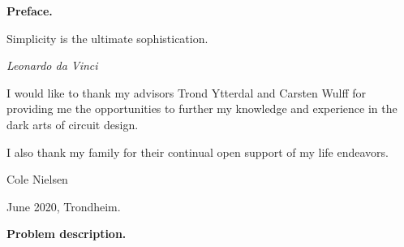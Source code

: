 	\pagebreak
	\thispagestyle{nohdr}
	\large\fontfamily{\sfdefault}\selectfont 
	\Huge\textbf{Preface.}\\
	\epigraph{Simplicity is the ultimate sophistication.}{\textit{Leonardo da Vinci}}
	\large\fontfamily{\rmdefault}\selectfont 
	\vspace{1em}
	I would like to thank my advisors Trond Ytterdal and Carsten Wulff for providing me the opportunities to further my knowledge and experience in the dark arts of circuit design.

	\par I also thank my family for their continual open support of my life endeavors.


	\vspace{6em}
	Cole Nielsen 

	\vspace{0em}
	June 2020, Trondheim.



	\pagebreak
	\thispagestyle{nohdr}
	\large\fontfamily{\sfdefault}\selectfont 
	\Huge\textbf{Problem description.}\\
	\large\fontfamily{\rmdefault}\selectfont 
	
